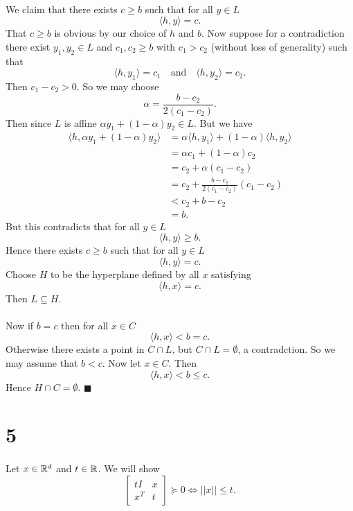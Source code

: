 \documentclass[letterpaper,12pt,oneside,onecolumn]{article}
\begin{document}
\paragraph{}
We claim that there exists $c\geq b$ such that for all $y \in L$
$$\langle h, y \rangle = c.$$
That $c \geq b$ is obvious by our choice of $h$ and $b$. Now suppose for a contradiction there exist $y_1, y_2 \in L$ and $c_1, c_2 \geq b$ with $c_1 > c_2$ (without loss of generality) such that $$\langle h, y_1 \rangle = c_1 \quad\text{and}\quad \langle h, y_2 \rangle = c_2.$$
Then $c_1 - c_2 > 0$. So we may choose
$$\alpha = \frac{b-c_2}{2(c_1-c_2)}.$$
Then since $L$ is affine $\alpha y_1 + (1-\alpha) y_2 \in L$. But we have
\begin{align*}
\langle h, \alpha y_1 + (1-\alpha) y_2 \rangle &= \alpha \langle h,y_1\rangle + (1- \alpha) \langle h, y_2 \rangle \\
&= \alpha c_1 + (1-\alpha) c_2 \\
&= c_2 + \alpha (c_1 - c_2) \\
&= c_2 + \frac{b-c_2}{2(c_1-c_2)}(c_1-c_2) \\
&< c_2 + b-c_2 \\
&= b. 
\end{align*}
But this contradicts that for all $y \in L$
$$\langle h, y \rangle \geq b.$$
Hence there exists $c \geq b$ such that for all $y \in L$
$$\langle h, y \rangle = c.$$
Choose $H$ to be the hyperplane defined by all $x$ satisfying
$$\langle h, x \rangle = c.$$
Then $L \subseteq H$. 
\paragraph{}
Now if $b=c$ then for all $x  \in C$ 
$$\langle h, x \rangle < b=c.$$
Otherwise there exists a point in $C \cap L$, but $C\cap L = \emptyset$, a contradction. So we may assume that $b < c$. Now let $x \in C$. Then
$$
\langle h, x \rangle  < b \leq c.
$$
Hence $H \cap C = \emptyset$. $\blacksquare$
\section*{5}
\paragraph{}
Let $x \in \mathbb{R}^d$ and $t\in \mathbb{R}$. We will show
$$\begin{bmatrix}tI & x \\ x^T & t \end{bmatrix} \succcurlyeq 0 \iff ||x|| \leq t.$$
\end{document}
